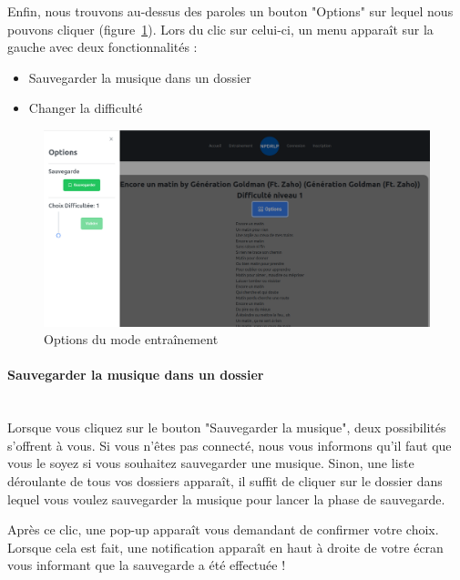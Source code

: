 \documentclass[12pt,french]{article}
\begin{document}
Enfin, nous trouvons au-dessus des paroles un bouton "Options" sur lequel nous pouvons cliquer (figure~\ref{figure13}). Lors du clic sur celui-ci, un menu apparaît sur la gauche avec deux fonctionnalités :

\begin{itemize}
	\item Sauvegarder la musique dans un dossier
	\item Changer la difficulté
\end{itemize}

\bigskip

\begin{figure}[H]
	\centering
	\includegraphics[scale=0.25]{optionparole.png}
	\caption{Options du mode entraînement}
	\label{figure13} 
\end{figure}

\newpage

\vspace*{5pt}

\paragraph{Sauvegarder la musique dans un dossier \\\\}

Lorsque vous cliquez sur le bouton "Sauvegarder la musique", deux possibilités s'offrent à vous. Si vous n'êtes pas connecté, nous vous informons qu'il faut que vous le soyez si vous souhaitez sauvegarder une musique. Sinon, une liste déroulante de tous vos dossiers apparaît, il suffit de cliquer sur le dossier dans lequel vous voulez sauvegarder la musique pour lancer la phase de sauvegarde.

Après ce clic, une pop-up apparaît vous demandant de confirmer votre choix. Lorsque cela est fait, une notification apparaît en haut à droite de votre écran vous informant que la sauvegarde a été effectuée !
\end{document}
